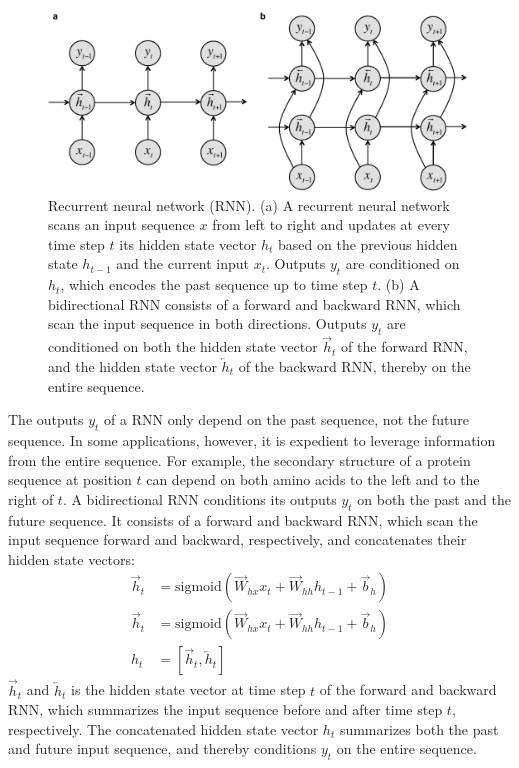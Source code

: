\begin{figure}[htbp!]
\centering
\includegraphics[width=1.0\textwidth]{rnn}
\caption[Recurrent neural network (RNN).]{Recurrent neural network (RNN). (a) A recurrent neural network scans an input sequence $x$ from left to right and updates at every time step $t$ its hidden state vector $h_t$ based on the previous hidden state $h_{t-1}$ and the current input $x_t$. Outputs $y_t$ are conditioned on $h_t$, which encodes the past sequence up to time step $t$. (b) A bidirectional RNN consists of a forward and backward RNN, which scan the input sequence in both directions. Outputs $y_t$ are conditioned on both the hidden state vector $\overrightarrow{h}_t$ of the forward RNN, and the hidden state vector $\overleftarrow{h}_t$ of the backward RNN, thereby on the entire sequence.}
\label{fig:rnn}
\end{figure}

The outputs $y_t$ of a RNN only depend on the past sequence, not the future sequence. In some applications, however, it is expedient to leverage information from the entire sequence. For example, the secondary structure of a protein sequence at position $t$ can depend on both amino acids to the left and to the right of $t$. A bidirectional RNN conditions its outputs $y_t$ on both the past and the future sequence. It consists of a forward and backward RNN, which scan the input sequence forward and backward, respectively, and concatenates their hidden state vectors:
\begin{align}
  \overrightarrow{h}_t&=\textrm{sigmoid}(\overrightarrow{W}_{hx}x_t+\overrightarrow{W}_{hh}h_{t-1}+\overrightarrow{b}_h) \\
  \overrightarrow{h}_t&=\textrm{sigmoid}(\overrightarrow{W}_{hx}x_t+\overrightarrow{W}_{hh}h_{t-1}+\overrightarrow{b}_h) \\
  h_t&=[\overrightarrow{h}_t, \overleftarrow{h}_t]
\end{align}
$\overrightarrow{h}_t$ and $\overleftarrow{h}_t$ is the hidden state vector at time step $t$ of the forward and backward RNN, which summarizes the input sequence before and after time step $t$, respectively. The concatenated hidden state vector $h_t$ summarizes both the past and future input sequence, and thereby conditions $y_t$ on the entire sequence.


